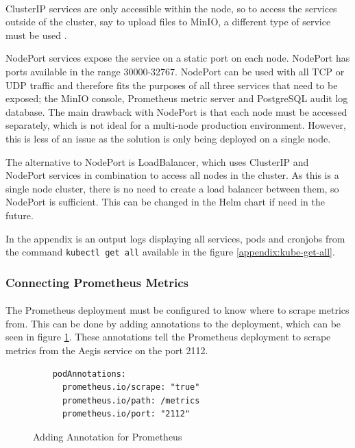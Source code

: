 \documentclass[12pt, conference, final, a4paper, onecolumn, compsoc]{IEEEtran}
\begin{document}
\paragraph{}

ClusterIP services are only accessible within the node, so to access the
services outside of the cluster, say to upload files to MinIO, a different type
of service must be used \citep{kube-svc}.

NodePort services expose the service on a static port on each node. NodePort has
ports available in the range 30000-32767. NodePort can be used with all TCP or
UDP traffic and therefore fits the purposes of all three services that need to
be exposed; the MinIO console, Prometheus metric server and PostgreSQL audit log
database. The main drawback with NodePort is that each node must be accessed
separately, which is not ideal for a multi-node production environment. However, this is
less of an issue as the solution is only being deployed on a single node.

The alternative to NodePort is LoadBalancer, which uses ClusterIP and NodePort
services in combination to access all nodes in the cluster. As this is a single
node cluster, there is no need to create a load balancer between them, so
NodePort is sufficient. This can be changed in the Helm chart if need in the
future.


In the appendix is an output logs displaying all services, pods and cronjobs
from the command \texttt{kubectl get all} available in the figure \ref{appendix:kube-get-all}.

\subsubsection*{Connecting Prometheus Metrics}
\paragraph{}
The Prometheus deployment must be configured to know where to scrape metrics
from. This can be done by adding annotations to the deployment, which can be
seen in figure \ref{fig:prometheus-annotations}. These annotations tell the
Prometheus deployment to scrape metrics from the Aegis service on the port 2112.

\begin{figure}[H]
\begin{lstlisting}
    podAnnotations:
      prometheus.io/scrape: "true"
      prometheus.io/path: /metrics
      prometheus.io/port: "2112"
\end{lstlisting}
  \caption{Adding Annotation for Prometheus}
  \label{fig:prometheus-annotations}
\end{figure}
\end{document}
